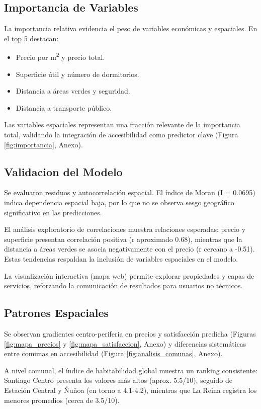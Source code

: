 \documentclass[11pt,letterpaper]{article}
\begin{document}
\subsection{Importancia de Variables}
La importancia relativa evidencia el peso de variables económicas y espaciales. En el top 5 destacan:
\begin{itemize}
    \item Precio por m\textsuperscript{2} y precio total.
    \item Superficie útil y número de dormitorios.
    \item Distancia a áreas verdes y seguridad.
    \item Distancia a transporte público.
\end{itemize}
Las variables espaciales representan una fracción relevante de la importancia total, validando la integración de accesibilidad como predictor clave (Figura \ref{fig:importancia}, Anexo).

\subsection{Validacion del Modelo}
Se evaluaron residuos y autocorrelación espacial. El índice de Moran (I = 0.0695) indica dependencia espacial baja, por lo que no se observa sesgo geográfico significativo en las predicciones.

El análisis exploratorio de correlaciones muestra relaciones esperadas: precio y superficie presentan correlación positiva (r aproximado 0.68), mientras que la distancia a áreas verdes se asocia negativamente con el precio (r cercano a -0.51). Estas tendencias respaldan la inclusión de variables espaciales en el modelo.

La visualización interactiva (mapa web) permite explorar propiedades y capas de servicios, reforzando la comunicación de resultados para usuarios no técnicos.

\subsection{Patrones Espaciales}
Se observan gradientes centro-periferia en precios y satisfacción predicha (Figuras \ref{fig:mapa_precios} y \ref{fig:mapa_satisfaccion}, Anexo) y diferencias sistemáticas entre comunas en accesibilidad (Figura \ref{fig:analisis_comunas}, Anexo).

A nivel comunal, el índice de habitabilidad global muestra un ranking consistente: Santiago Centro presenta los valores más altos (aprox. 5.5/10), seguido de Estación Central y Ñuñoa (en torno a 4.1-4.2), mientras que La Reina registra los menores promedios (cerca de 3.5/10).
\end{document}
